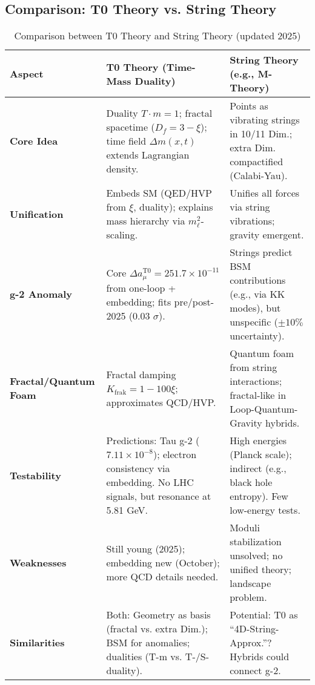 \documentclass[12pt,a4paper]{article}
\begin{document}
	\subsection{Comparison: T0 Theory vs. String Theory}
	
	\begin{table}[ht]
		\centering
		\begin{tabular}{|p{4cm}|p{5cm}|p{5cm}|}
			\hline
			\textbf{Aspect} & \textbf{T0 Theory (Time-Mass Duality)} & \textbf{String Theory (e.g., M-Theory)} \\
			\hline
			\textbf{Core Idea} & Duality $T \cdot m = 1$; fractal spacetime ($D_f = 3 - \xi$); time field $\Delta m(x,t)$ extends Lagrangian density. & Points as vibrating strings in 10/11 Dim.; extra Dim. compactified (Calabi-Yau). \\
			\hline
			\textbf{Unification} & Embeds SM (QED/HVP from $\xi$, duality); explains mass hierarchy via $m_\ell^2$-scaling. & Unifies all forces via string vibrations; gravity emergent. \\
			\hline
			\textbf{g-2 Anomaly} & Core $\Delta a_\mu^\text{T0} = 251.7 \times 10^{-11}$ from one-loop + embedding; fits pre/post-2025 (0.03 $\sigma$). & Strings predict BSM contributions (e.g., via KK modes), but unspecific ($\pm 10\%$ uncertainty). \\
			\hline
			\textbf{Fractal/Quantum Foam} & Fractal damping $K_\text{frak} = 1 - 100\xi$; approximates QCD/HVP. & Quantum foam from string interactions; fractal-like in Loop-Quantum-Gravity hybrids. \\
			\hline
			\textbf{Testability} & Predictions: Tau g-2 ($7.11 \times 10^{-8}$); electron consistency via embedding. No LHC signals, but resonance at 5.81 GeV. & High energies (Planck scale); indirect (e.g., black hole entropy). Few low-energy tests. \\
			\hline
			\textbf{Weaknesses} & Still young (2025); embedding new (October); more QCD details needed. & Moduli stabilization unsolved; no unified theory; landscape problem. \\
			\hline
			\textbf{Similarities} & Both: Geometry as basis (fractal vs. extra Dim.); BSM for anomalies; dualities (T-m vs. T-/S-duality). & Potential: T0 as ``4D-String-Approx.''? Hybrids could connect g-2. \\
			\hline
		\end{tabular}
		\caption{Comparison between T0 Theory and String Theory (updated 2025)}
		\label{tab:string_comparison}
	\end{table}
	
\end{document}
